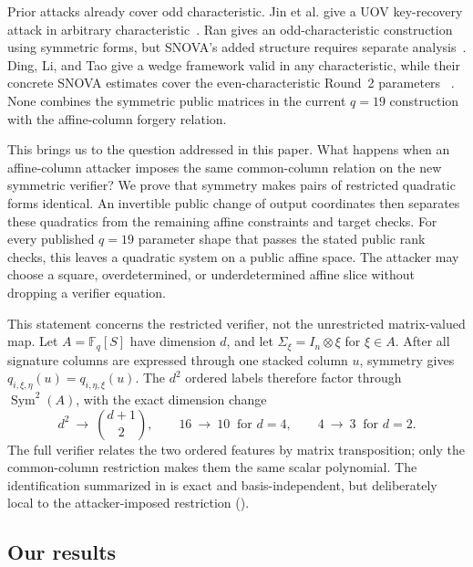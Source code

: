\documentclass[11pt]{article}
\newcommand{\F}{\mathbb F}
\newcommand{\Sym}{\operatorname{Sym}}
\begin{document}
Prior attacks already cover odd characteristic.  Jin et al. give a UOV
key-recovery attack in arbitrary characteristic~\cite{JinEtAl2026}.  Ran gives
an odd-characteristic construction using symmetric forms, but SNOVA's added
structure requires separate analysis~\cite{Ran2026}.  Ding, Li, and Tao give a
wedge framework valid in any characteristic, while their concrete SNOVA
estimates cover the even-characteristic Round~2 parameters
~\cite{DingLiTao2026}.  None combines the symmetric public matrices in the
current $q=19$ construction with the affine-column forgery relation.

This brings us to the question addressed in this paper.  What happens when an
affine-column attacker imposes the same common-column relation on the new
symmetric verifier?  We prove that symmetry makes pairs of restricted
quadratic forms identical.  An invertible public change of output coordinates
then separates these quadratics from the remaining affine constraints and
target checks.  For every published $q=19$ parameter shape that passes the
stated public rank checks, this leaves a quadratic system on a public affine
space.  The attacker may choose a square, overdetermined, or underdetermined
affine slice without dropping a verifier equation.

This statement concerns the restricted verifier, not the unrestricted
matrix-valued map.  Let $A=\F_q[S]$ have dimension $d$, and let
$\Sigma_\xi=I_n\otimes\xi$ for $\xi\in A$.  After all signature columns are
expressed through one stacked column $u$, symmetry gives
$q_{i,\xi,\eta}(u)=q_{i,\eta,\xi}(u)$.  The $d^2$ ordered labels therefore
factor through $\Sym^2(A)$, with the exact dimension change
\begin{equation}
 d^2\ \longrightarrow\ \binom{d+1}{2},
 \qquad 16\ \longrightarrow\ 10\ \text{ for }d=4,
 \qquad 4\ \longrightarrow\ 3\ \text{ for }d=2.
 \label{eq:intro-duplication}
\end{equation}
The full verifier relates the two ordered features by matrix transposition;
only the common-column restriction makes them the same scalar polynomial.
The identification summarized in  is exact and
basis-independent, but deliberately local to the attacker-imposed
restriction ().

\subsection{Our results}
\end{document}
